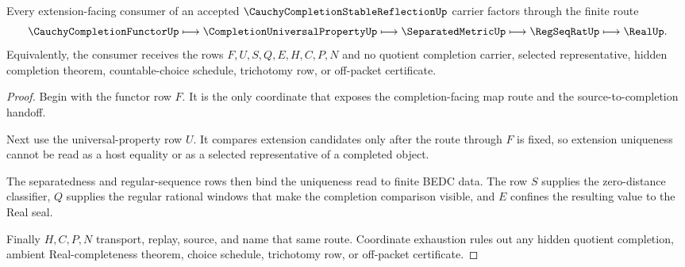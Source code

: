 \begin{theorem}
\label{thm:cauchy-completion-stable-reflection-extension-route}
Every extension-facing consumer of an accepted $\CauchyCompletionStableReflectionUp$ carrier factors through the finite route
$$
\CauchyCompletionFunctorUp \longmapsto \CompletionUniversalPropertyUp \longmapsto \SeparatedMetricUp \longmapsto \RegSeqRatUp \longmapsto \RealUp .
$$
Equivalently, the consumer receives the rows $F,U,S,Q,E,H,C,P,N$ and no quotient completion carrier, selected representative, hidden completion theorem, countable-choice schedule, trichotomy row, or off-packet certificate.
\end{theorem}
\begin{proof}
Begin with the functor row $F$. It is the only coordinate that exposes the completion-facing map route and the source-to-completion handoff.

Next use the universal-property row $U$. It compares extension candidates only after the route through $F$ is fixed, so extension uniqueness cannot be read as a host equality or as a selected representative of a completed object.

The separatedness and regular-sequence rows then bind the uniqueness read to finite BEDC data. The row $S$ supplies the zero-distance classifier, $Q$ supplies the regular rational windows that make the completion comparison visible, and $E$ confines the resulting value to the Real seal.

Finally $H,C,P,N$ transport, replay, source, and name that same route. Coordinate exhaustion rules out any hidden quotient completion, ambient Real-completeness theorem, choice schedule, trichotomy row, or off-packet certificate.
\end{proof}


\begin{closurestatus}{\CauchyCompletionStableReflectionUp}
  \theoryclosure{\seedClosure}
  \formalstatus{\unformalizedV}
\end{closurestatus}
